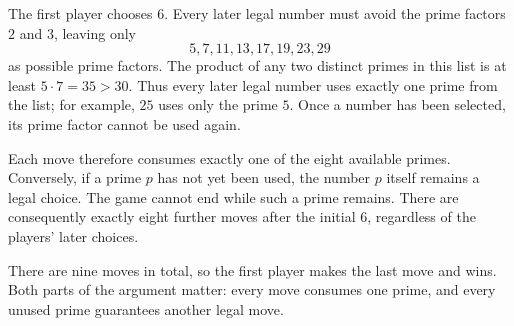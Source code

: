 The first player chooses $6$. Every later legal number must avoid the prime factors $2$ and $3$, leaving only
\[
 5,7,11,13,17,19,23,29
\]
as possible prime factors. The product of any two distinct primes in this list is at least $5\cdot7=35>30$. Thus every later legal number uses exactly one prime from the list; for example, $25$ uses only the prime $5$. Once a number has been selected, its prime factor cannot be used again.

Each move therefore consumes exactly one of the eight available primes. Conversely, if a prime $p$ has not yet been used, the number $p$ itself remains a legal choice. The game cannot end while such a prime remains. There are consequently exactly eight further moves after the initial $6$, regardless of the players' later choices.

There are nine moves in total, so the first player makes the last move and wins. Both parts of the argument matter: every move consumes one prime, and every unused prime guarantees another legal move.
